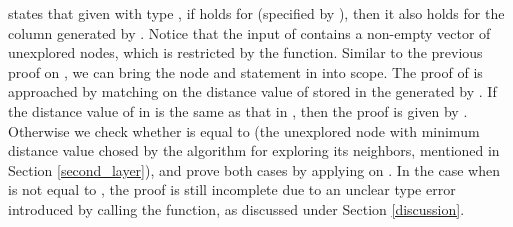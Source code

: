  states that given  with type , if  holds for  (specified by ), then it also holds for the column generated by . Notice that the input  of  contains a non-empty vector of unexplored nodes, which is restricted by the  function. Similar to the previous proof on , we can bring the node  and statement  in  into scope. The proof of  is approached by matching on the distance value of  stored in the  generated by . If the distance value of  in  is the same as that in , then the proof is given by . Otherwise we check whether  is equal to  (the unexplored node with minimum distance value chosed by the algorithm for exploring its neighbors, mentioned in Section \ref{second_layer}), and prove both cases by applying  on . In the case when  is not equal to , the proof is still incomplete due to an unclear type error introduced by calling the  function, as discussed under Section \ref{discussion}.
\\
